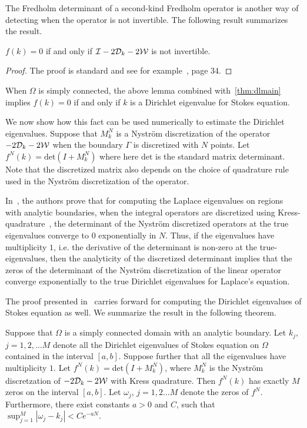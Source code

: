 The Fredholm determinant of a second-kind Fredholm operator
is another way of detecting when the operator is not invertible. 
The following result summarizes the result. 
\begin{lemma}
$f(k) = 0$ if and only if $\mathcal I - 2{\mathcal D}_{k} -2{\mathcal W}$ 
is not invertible.
\end{lemma}
\begin{proof}
The proof is standard and see for example~\cite{simon2005trace}, page 34.
\end{proof}

When $\Omega$ is simply connected, the above lemma combined 
with~\cref{thm:dlmain} implies $f(k) = 0$ if and only if $k$ 
is a Dirichlet eigenvalue for Stokes equation.

We now show how this fact can be used numerically
to estimate the Dirichlet eigenvalues.
Suppose that $M_{k}^{N}$ is a Nystr\"{o}m discretization 
of the operator $-2{\mathcal D}_{k} - 2{\mathcal W}$ when the boundary 
$\Gamma$ is discretized with $N$ points. 
Let $f^{N}(k) = \text{det}(I + M_{k}^{N})$
where here $\text{det}$ is the standard matrix determinant.
Note that the discretized matrix also depends on the choice
of quadrature rule used in the Nystr\"{o}m discretization
of the operator.


In~\cite{zhao2015robust}, the authors prove that
for computing the Laplace eigenvalues on regions with 
analytic boundaries, when the integral
operators are discretized using Kress-quadrature~\cite{kress1991boundary},
the determinant of the Nystr\"{o}m discretized operators
at the true eigenvalues converge to $0$ exponentially in $N$.
Thus, if the eigenvalues have multiplicity $1$, i.e. the
derivative of the determinant is non-zero at the true-eigenvalues,
then the analyticity of the discretized determinant implies
that the zeros of the determinant of the Nystr\"{o}m 
discretization of the linear operator converge
exponentially to the true Dirichlet eigenvalues for Laplace's equation.

The proof presented in~\cite{zhao2015robust} carries forward
for computing the Dirichlet eigenvalues of Stokes equation as well.
We summarize the result in the following theorem.
\begin{thrm}
\label{thm:mainconvfreddet}
Suppose that $\Omega$ is a simply connected domain with an analytic boundary.
Let $k_{j}$, $j=1,2,\ldots M$ denote all the Dirichlet eigenvalues of Stokes
equation on $\Omega$ contained in the interval $[a,b]$. 
Suppose further that all the eigenvalues have multiplicity $1$.
Let $f^{N}(k) = \text{det}(I+M^{N}_{k})$, where $M^{N}_{k}$ 
is the Nystr\"{o}m discretzation of $-2{\mathcal D}_{k} - 2{\mathcal W}$ with Kress
quadrature.
Then $f^{N}(k)$ has exactly $M$ zeros on the interval $[a,b]$. 
Let $\omega_{j}$, $j=1,2\ldots M$ denote the zeros of $f^{N}$.
Furthermore, there exist constants $a>0$ and $C$, 
such that $\sup_{j=1}^{M} |\omega_{j} - k_{j}| < C e^{-aN}$.
\end{thrm}


